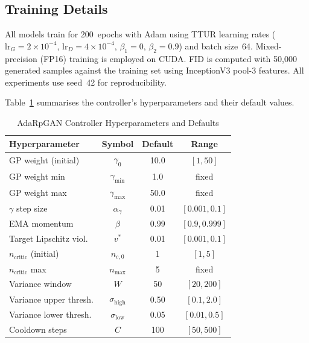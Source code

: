\documentclass{article}
\newcommand{\vtarget}{v^{*}}
\newcommand{\ncritic}{n_{\mathrm{critic}}}
\newcommand{\ncmax}{n_{\mathrm{max}}}
\begin{document}
\subsection{Training Details}

All models train for 200~epochs with Adam using TTUR learning rates ($\mathrm{lr}_G = 2{\times}10^{-4}$, $\mathrm{lr}_D = 4{\times}10^{-4}$, $\beta_1=0$, $\beta_2=0.9$) and batch size~64. Mixed-precision (FP16) training is employed on CUDA. FID is computed with 50{,}000 generated samples against the training set using InceptionV3 pool-3 features. All experiments use seed~42 for reproducibility.

Table~\ref{tab:hyperparams} summarises the controller's hyperparameters and their default values.

\begin{table}[t]
\caption{AdaRpGAN Controller Hyperparameters and Defaults}
\label{tab:hyperparams}
\centering
\begin{tabular}{l c c c}
\toprule
\textbf{Hyperparameter} & \textbf{Symbol} & \textbf{Default} & \textbf{Range} \\
\midrule
GP weight (initial)       & $\gamma_0$          & 10.0   & $[1, 50]$        \\
GP weight min             & $\gamma_{\min}$     & 1.0    & fixed            \\
GP weight max             & $\gamma_{\max}$     & 50.0   & fixed            \\
$\gamma$ step size        & $\alpha_\gamma$     & 0.01   & $[0.001, 0.1]$   \\
EMA momentum              & $\beta$             & 0.99   & $[0.9, 0.999]$   \\
Target Lipschitz viol.    & $\vtarget$          & 0.01   & $[0.001, 0.1]$   \\
$\ncritic$ (initial)      & $n_{c,0}$           & 1      & $[1, 5]$         \\
$\ncritic$ max            & $\ncmax$            & 5      & fixed            \\
Variance window           & $W$                 & 50     & $[20, 200]$      \\
Variance upper thresh.    & $\sigma_{\mathrm{high}}$ & 0.50 & $[0.1, 2.0]$ \\
Variance lower thresh.    & $\sigma_{\mathrm{low}}$  & 0.05 & $[0.01, 0.5]$\\
Cooldown steps            & $C$                 & 100    & $[50, 500]$      \\
\bottomrule
\end{tabular}
\end{table}
\end{document}
